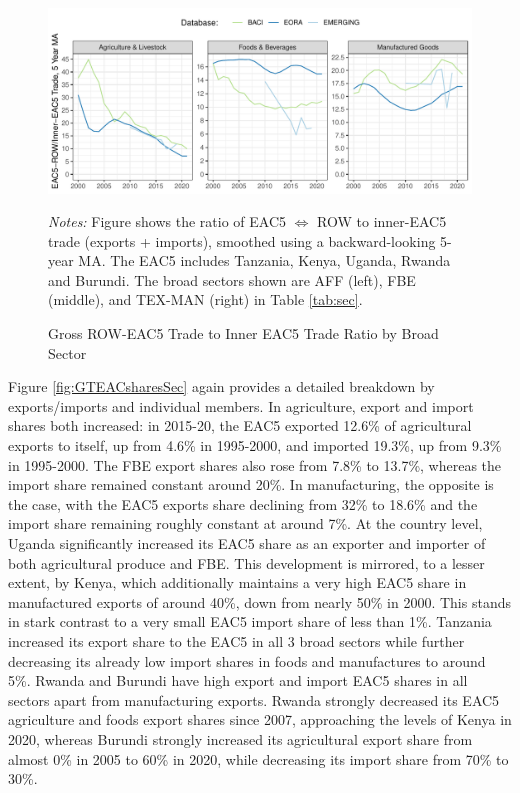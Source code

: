 \documentclass[a4paper]{article}
\begin{document}
\begin{figure}[h!]
\centering
\caption{\label{fig:EAC_ROW_Ratios_Sec} Gross ROW-EAC5 Trade to Inner EAC5 Trade Ratio by Broad Sector}
\includegraphics[width = \textwidth]{"Figures/ROW_EAC_Trade_Ratios_Sec_5YMA.pdf"}
\raggedright
\scriptsize 
\emph{Notes:} Figure shows the ratio of EAC5 $\Leftrightarrow$ ROW to inner-EAC5 trade (exports + imports), smoothed using a backward-looking 5-year MA. The EAC5 includes Tanzania, Kenya, Uganda, Rwanda and Burundi. The broad sectors shown are AFF (left), FBE (middle), and TEX-MAN (right) in Table \ref{tab:sec}.
\end{figure}

Figure \ref{fig:GTEACsharesSec} again provides a detailed breakdown by exports/imports and individual members. In agriculture, export and import shares both increased: in 2015-20, the EAC5 exported 12.6\% of agricultural exports to itself, up from 4.6\% in 1995-2000, and imported 19.3\%, up from 9.3\% in 1995-2000. The FBE export shares also rose from 7.8\% to 13.7\%, whereas the import share remained constant around 20\%. In manufacturing, the opposite is the case, with the EAC5 exports share declining from 32\% to 18.6\% and the import share remaining roughly constant at around 7\%. At the country level, Uganda significantly increased its EAC5 share as an exporter and importer of both agricultural produce and FBE. This development is mirrored, to a lesser extent, by Kenya, which additionally maintains a very high EAC5 share in manufactured exports of around 40\%, down from nearly 50\% in 2000. This stands in stark contrast to a very small EAC5 import share of less than 1\%. Tanzania increased its export share to the EAC5 in all 3 broad sectors while further decreasing its already low import shares in foods and manufactures to around 5\%. Rwanda and Burundi have high export and import EAC5 shares in all sectors apart from manufacturing exports. Rwanda strongly decreased its EAC5 agriculture and foods export shares since 2007, approaching the levels of Kenya in 2020, whereas Burundi strongly increased its agricultural export share from almost 0\% in 2005 to 60\% in 2020, while decreasing its import share from 70\% to 30\%. \newline 
\end{document}
